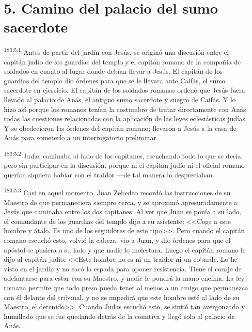 \section*{5. Camino del palacio del sumo sacerdote}
\par 
\textsuperscript{183:5.1} Antes de partir del jardín con Jesús, se originó una discusión entre el capitán judío de los guardias del templo y el capitán romano de la compañía de soldados en cuanto al lugar donde debían llevar a Jesús. El capitán de los guardias del templo dio órdenes para que se le llevara ante Caifás, el sumo sacerdote en ejercicio. El capitán de los soldados romanos ordenó que Jesús fuera llevado al palacio de Anás, el antiguo sumo sacerdote y suegro de Caifás. Y lo hizo así porque los romanos tenían la costumbre de tratar directamente con Anás todas las cuestiones relacionadas con la aplicación de las leyes eclesiásticas judías. Y se obedecieron las órdenes del capitán romano; llevaron a Jesús a la casa de Anás para someterlo a un interrogatorio preliminar.

\par 
\textsuperscript{183:5.2} Judas caminaba al lado de los capitanes, escuchando todo lo que se decía, pero sin participar en la discusión, porque ni el capitán judío ni el oficial romano querían siquiera hablar con el traidor ---de tal manera lo despreciaban.

\par 
\textsuperscript{183:5.3} Casi en aquel momento, Juan Zebedeo recordó las instrucciones de su Maestro de que permaneciera siempre cerca, y se aproximó apresuradamente a Jesús que caminaba entre los dos capitanes. Al ver que Juan se ponía a su lado, el comandante de los guardias del templo dijo a su asistente: <<Coge a este hombre y átalo. Es uno de los seguidores de este tipo>>. Pero cuando el capitán romano escuchó esto, volvió la cabeza, vio a Juan, y dio órdenes para que el apóstol se pusiera a su lado y que nadie lo molestara. Luego el capitán romano le dijo al capitán judío: <<Este hombre no es ni un traidor ni un cobarde. Lo he visto en el jardín y no sacó la espada para oponer resistencia. Tiene el coraje de adelantarse para estar con su Maestro, y nadie le pondrá la mano encima. La ley romana permite que todo preso pueda tener al menos a un amigo que permanezca con él delante del tribunal, y no se impedirá que este hombre esté al lado de su Maestro, el detenido>>. Cuando Judas escuchó esto, se sintió tan avergonzado y humillado que se fue quedando detrás de la comitiva y llegó solo al palacio de Anás.

